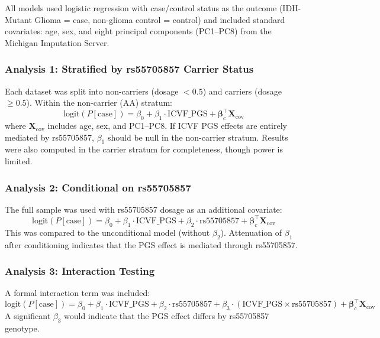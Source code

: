 \documentclass[11pt,a4paper]{article}
\newcommand{\phenolabel}{IDH-Mutant Glioma}
\begin{document}
All models used logistic regression with case/control status as the outcome (\phenolabel{} = case, non-glioma control = control) and included standard covariates: age, sex, and eight principal components (PC1--PC8) from the Michigan Imputation Server.

\subsubsection{Analysis 1: Stratified by rs55705857 Carrier Status}

Each dataset was split into non-carriers (dosage $< 0.5$) and carriers (dosage $\geq 0.5$). Within the non-carrier (AA) stratum:
\begin{equation}
\text{logit}(P[\text{case}]) = \beta_0 + \beta_1 \cdot \text{ICVF\_PGS} + \boldsymbol{\beta}_c^\top \mathbf{X}_{\text{cov}}
\end{equation}
where $\mathbf{X}_{\text{cov}}$ includes age, sex, and PC1--PC8. If ICVF PGS effects are entirely mediated by rs55705857, $\beta_1$ should be null in the non-carrier stratum. Results were also computed in the carrier stratum for completeness, though power is limited.

\subsubsection{Analysis 2: Conditional on rs55705857}

The full sample was used with rs55705857 dosage as an additional covariate:
\begin{equation}
\text{logit}(P[\text{case}]) = \beta_0 + \beta_1 \cdot \text{ICVF\_PGS} + \beta_2 \cdot \text{rs55705857} + \boldsymbol{\beta}_c^\top \mathbf{X}_{\text{cov}}
\end{equation}
This was compared to the unconditional model (without $\beta_2$). Attenuation of $\beta_1$ after conditioning indicates that the PGS effect is mediated through rs55705857.

\subsubsection{Analysis 3: Interaction Testing}

A formal interaction term was included:
\begin{equation}
\text{logit}(P[\text{case}]) = \beta_0 + \beta_1 \cdot \text{ICVF\_PGS} + \beta_2 \cdot \text{rs55705857} + \beta_3 \cdot (\text{ICVF\_PGS} \times \text{rs55705857}) + \boldsymbol{\beta}_c^\top \mathbf{X}_{\text{cov}}
\end{equation}
A significant $\beta_3$ would indicate that the PGS effect differs by rs55705857 genotype.
\end{document}
